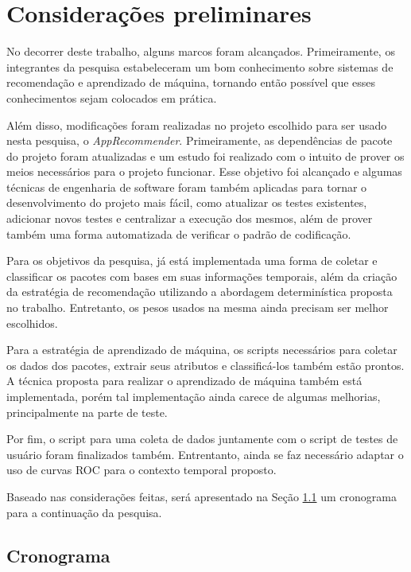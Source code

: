 \chapter[Considerações preliminares]{Considerações preliminares}

No decorrer deste trabalho, alguns marcos foram alcançados. Primeiramente, os
integrantes da pesquisa estabeleceram um bom conhecimento sobre sistemas de
recomendação e aprendizado de máquina, tornando então possível que esses
conhecimentos sejam colocados em prática.

Além disso, modificações foram realizadas no projeto escolhido para ser usado
nesta pesquisa, o \textit{AppRecommender}. Primeiramente, as dependências de pacote do
projeto foram atualizadas e um estudo foi realizado com o intuito de prover os
meios necessários para o projeto funcionar. Esse objetivo foi alcançado e
algumas técnicas de engenharia de software foram também aplicadas para tornar o
desenvolvimento do projeto mais fácil, como atualizar os testes existentes, adicionar novos testes
e centralizar a execução dos mesmos, além de prover também uma forma automatizada de
verificar o padrão de codificação.

Para os objetivos da pesquisa, já está implementada uma forma de coletar e
classificar os pacotes com bases em suas informações temporais, além da criação
da estratégia de recomendação utilizando a abordagem determinística proposta no
trabalho. Entretanto, os pesos usados na mesma ainda precisam ser melhor escolhidos.

Para a estratégia de aprendizado de máquina, os scripts necessários para coletar
os dados dos pacotes, extrair seus atributos e classificá-los também estão
prontos. A técnica proposta para realizar o aprendizado de máquina também está
implementada, porém tal implementação ainda carece de algumas melhorias,
principalmente na parte de teste.

Por fim, o script para uma coleta de dados juntamente com o script de testes de
usuário foram finalizados também. Entrentanto, ainda se faz necessário adaptar o
uso de curvas ROC para o contexto temporal proposto.

Baseado nas considerações feitas, será apresentado na Seção \ref{sec:cronagrama} um cronograma
para a continuação da pesquisa.

\section{Cronograma} \label{sec:cronagrama}

